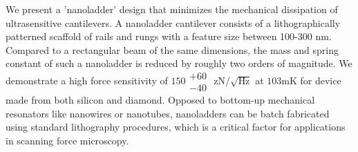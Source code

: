 We present a 'nanoladder' design that minimizes the mechanical dissipation of ultrasensitive cantilevers. A nanoladder cantilever consists of a lithographically patterned scaffold of rails and rungs with a feature size between 100-300 nm. Compared to a rectangular beam of the same dimensions, the mass and spring constant of such a nanoladder is reduced by roughly two orders of magnitude. We demonstrate a high force sensitivity of $150 \substack{+60 \\ -40}$ zN$/\sqrt{\text{Hz}}$ at $103\text{mK}$ for device made from both silicon and diamond. Opposed to bottom-up mechanical resonators like nanowires or nanotubes, nanoladders can be batch fabricated using standard lithography procedures, which is a critical factor for applications in scanning force microscopy.